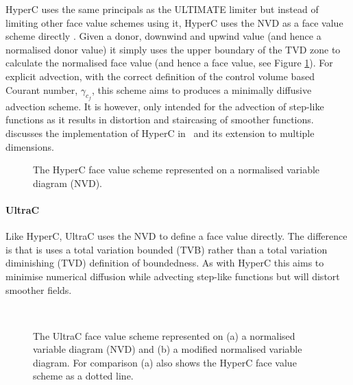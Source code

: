 HyperC uses the same principals as the ULTIMATE limiter but instead of limiting other face value schemes using it, HyperC uses the NVD as a face value scheme directly \citep{leonard_ultimate_1991}.  Given a donor, downwind and upwind value (and hence a normalised donor value) it simply uses the upper boundary of the TVD zone to calculate the normalised face value (and hence a face value, see Figure \ref{fig:hyperc}).  For explicit advection, with the correct definition of the control volume based Courant number,  $\gamma_{c_f}$, this scheme aims to produces a minimally diffusive advection scheme.  It is however, only intended for the advection of step-like functions as it results in distortion and staircasing of smoother functions. \citet{wilson_phdthesis_2009} discusses the implementation of HyperC in \fluidity\ and its extension to multiple dimensions.

\begin{figure}[tbp]
\begin{center}
\caption{The HyperC face value scheme represented on a normalised variable diagram (NVD).}
\label{fig:hyperc}
\end{center}
\end{figure}

\paragraph{UltraC}

Like HyperC, UltraC uses the NVD to define a face value directly.  The difference is that is uses a total variation bounded (TVB) rather than a total variation diminishing (TVD) definition of boundedness.  As with HyperC this aims to minimise numerical diffusion while advecting step-like functions but will distort smoother fields.

\begin{figure}[tbp]
\begin{center}
 \\ \vspace{0.5cm}
\caption{The UltraC face value scheme represented on (a) a normalised variable diagram (NVD) and (b) a modified normalised variable diagram.  For comparison (a) also shows the HyperC face value scheme as a dotted line.}
\label{fig:ultrac}
\end{center}
\end{figure}


